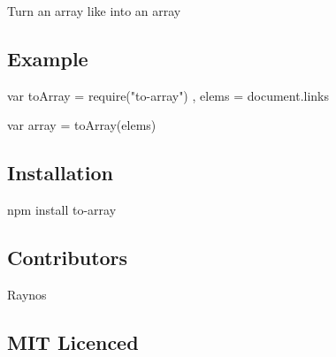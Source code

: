 Turn an array like into an array

\subsection*{Example}


\begin{DoxyCode}
var toArray = require("to-array")
    , elems = document.links

var array = toArray(elems)
\end{DoxyCode}


\subsection*{Installation}

{\ttfamily npm install to-\/array}

\subsection*{Contributors}


\begin{DoxyItemize}
\item Raynos
\end{DoxyItemize}

\subsection*{M\+IT Licenced}